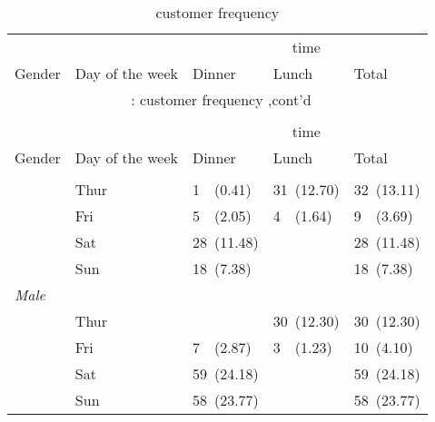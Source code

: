 \documentclass{article}
\begin{document}
\hypertarget{customer frequency}{} 
\begin{longtable}{lllll}
\caption{customer frequency}\\
\toprule
&&
\multicolumn{ 3 }{c}{ time } \\
\cmidrule(lr){3-5}
Gender & Day of the week & Dinner & Lunch & Total \\
\hline
\endfirsthead
\multicolumn{5}{c}{\tablename~\thetable{}: customer frequency ,cont'd}\\\\
\toprule
&&
\multicolumn{ 3 }{c}{ time } \\
\cmidrule(lr){3-5}
Gender & Day of the week & Dinner & Lunch & Total \\
\hline
\endhead \hline \endfoot \hline

\endlastfoot
\multicolumn{ 4 }{l}{\textit{ Female }}\\
& Thur & 1~~(0.41) & 31~(12.70) & 32~(13.11) \\
 & Fri & 5~~(2.05) & 4~~(1.64) & 9~~(3.69) \\
 & Sat & 28~(11.48) &  & 28~(11.48) \\
 & Sun & 18~(7.38) &  & 18~(7.38) \\
[2ex]
\multicolumn{ 4 }{l}{\textit{ Male }}\\
& Thur &  & 30~(12.30) & 30~(12.30) \\
 & Fri & 7~~(2.87) & 3~~(1.23) & 10~(4.10) \\
 & Sat & 59~(24.18) &  & 59~(24.18) \\
 & Sun & 58~(23.77) &  & 58~(23.77) \\
[2ex]
\end{longtable}
\end{document}
